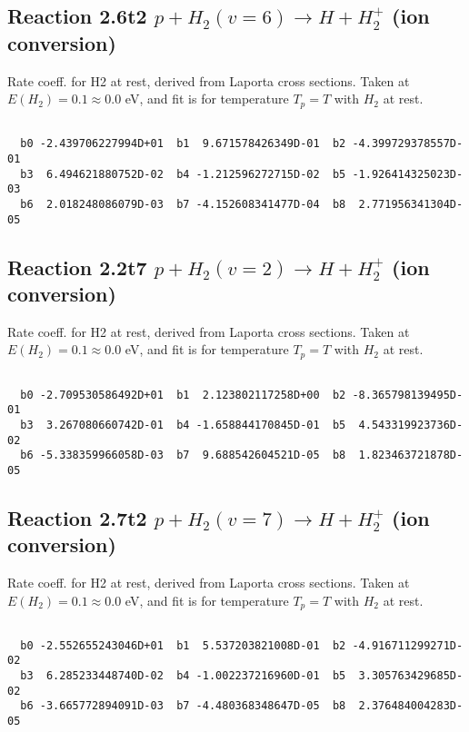 \documentclass[12pt,dvipdfmx]{article}
\begin{document}
\newpage
\subsection{
Reaction 2.6t2
$ p + H_2(v=6) \rightarrow H + H_2^+$ (ion conversion)
}
Rate coeff. for H2 at rest, derived from Laporta cross sections.
Taken at $E(H_2) = 0.1 \approx 0.0$ eV,  and fit is for temperature $T_p=T$ with $H_2$ at rest.

\begin{small}\begin{verbatim}

  b0 -2.439706227994D+01  b1  9.671578426349D-01  b2 -4.399729378557D-01
  b3  6.494621880752D-02  b4 -1.212596272715D-02  b5 -1.926414325023D-03
  b6  2.018248086079D-03  b7 -4.152608341477D-04  b8  2.771956341304D-05

\end{verbatim}\end{small}

\newpage
\subsection{
Reaction 2.2t7
$ p + H_2(v=2) \rightarrow H + H_2^+$ (ion conversion)
}
Rate coeff. for H2 at rest, derived from Laporta cross sections.
Taken at $E(H_2) = 0.1 \approx 0.0$ eV,  and fit is for temperature $T_p=T$ with $H_2$ at rest.

\begin{small}\begin{verbatim}

  b0 -2.709530586492D+01  b1  2.123802117258D+00  b2 -8.365798139495D-01
  b3  3.267080660742D-01  b4 -1.658844170845D-01  b5  4.543319923736D-02
  b6 -5.338359966058D-03  b7  9.688542604521D-05  b8  1.823463721878D-05

\end{verbatim}\end{small}

\newpage
\subsection{
Reaction 2.7t2
$ p + H_2(v=7) \rightarrow H + H_2^+$ (ion conversion)
}
Rate coeff. for H2 at rest, derived from Laporta cross sections.
Taken at $E(H_2) = 0.1 \approx 0.0$ eV,  and fit is for temperature $T_p=T$ with $H_2$ at rest.

\begin{small}\begin{verbatim}

  b0 -2.552655243046D+01  b1  5.537203821008D-01  b2 -4.916711299271D-02
  b3  6.285233448740D-02  b4 -1.002237216960D-01  b5  3.305763429685D-02
  b6 -3.665772894091D-03  b7 -4.480368348647D-05  b8  2.376484004283D-05

\end{verbatim}\end{small}
\end{document}
